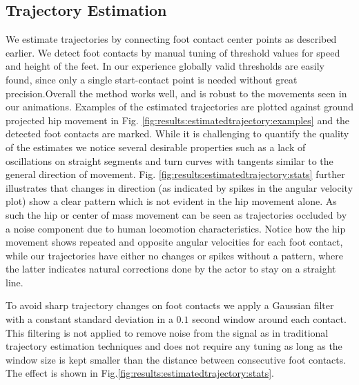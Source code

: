 \subsection{Trajectory Estimation}
We estimate trajectories by connecting foot contact center points as described earlier. We detect foot contacts by manual tuning of threshold values for speed and height of the feet. In our experience globally valid thresholds are easily found, since only a single start-contact point is needed without great precision.Overall the method works well, and is robust to the movements seen in our animations. Examples of the estimated trajectories are plotted against ground projected hip movement in Fig. \ref{fig:results:estimatedtrajectory:examples} and the detected foot contacts are marked. While it is challenging to quantify the quality of the estimates we notice several desirable properties such as a lack of oscillations on straight segments and turn curves with tangents similar to the general direction of movement. Fig. \ref{fig:results:estimatedtrajectory:stats} further illustrates that changes in direction (as indicated by spikes in the angular velocity plot) show a clear pattern  which is not evident in the hip movement alone. As such the hip or center of mass movement can be seen as trajectories occluded by a noise component due to human locomotion characteristics. Notice how the hip movement shows repeated and opposite angular velocities for each foot contact, while our trajectories have either no changes or spikes without a pattern, where the latter indicates natural corrections done by the actor to stay on a straight line. 

To avoid sharp trajectory changes on foot contacts we apply a Gaussian filter with a constant standard deviation in a $0.1$ second window around each contact. This filtering is not applied to remove noise from the signal as in traditional trajectory estimation techniques and does not require any tuning as long as the window size is kept smaller than the distance between consecutive foot contacts. The effect is shown in Fig.\ref{fig:results:estimatedtrajectory:stats}.   

